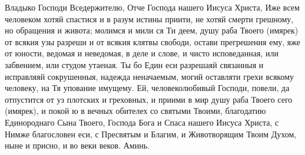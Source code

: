 \begin{mymulticols}

Владыко Господи Вседержителю, Отче Господа нашего Иисуса Христа, Иже всем человеком хотяй спастися и в разум истины приити, не хотяй смерти грешному, но обращения и живота; молимся и мили ся Ти деем, душу раба Твоего (имярек) от всякия узы разреши и от всякия клятвы свободи, остави прегрешения ему, яже от юности, ведомая и неведомая, в деле и слове, и чисто исповеданная, или забвением, или студом утаеная. Ты бо Един еси разрешаяй связанныя и исправляяй сокрушенныя, надежда неначаемым, могий оставляти грехи всякому человеку, на Тя упование имущему. Ей, человеколюбивый Господи, повели, да отпустится от уз плотских и греховных, и приими в мир душу раба Твоего сего (имярек), и покой ю в вечных обителех со святыми Твоими, благодатию Единороднаго Сына Твоего, Господа Бога и Спаса нашего Иисуса Христа, с Нимже благословен еси, с Пресвятым и Благим, и Животворящим Твоим Духом, ныне и присно, и во веки веков. Аминь.

\end{mymulticols}

\mychapterending

